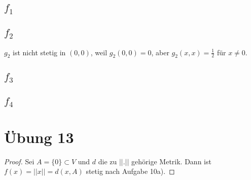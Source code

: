 \documentclass[10pt,a4paper]{article}
\begin{document}
\subsection*{$f_{1}$}

\subsection*{$f_{2}$}

$g_{2}$ ist nicht stetig in $(0, 0)$, weil $g_{2}(0, 0) = 0$, aber $g_{2}(x, x) = \frac{1}{2}$ für $x \ne 0$.

\subsection*{$f_{3}$}

\subsection*{$f_{4}$}

\section*{Übung 13}

\begin{proof}
Sei $A = \{0\} \subset V$ und $d$ die zu $||.||$ gehörige Metrik.
Dann ist $f(x) = ||x|| = d(x, A)$ stetig nach Aufgabe 10a).
\end{proof}
\end{document}
